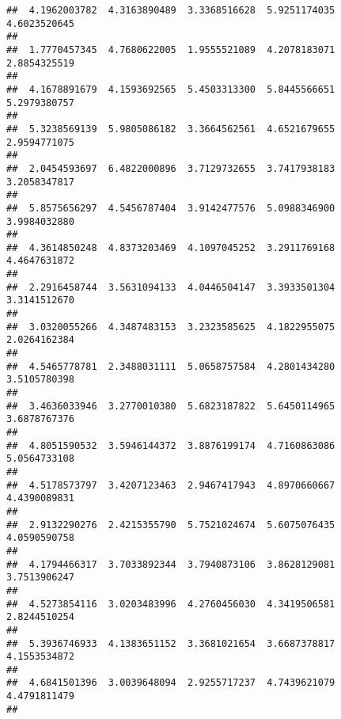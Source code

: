 \documentclass[]{article}
\begin{document}
\begin{verbatim}
##  4.1962003782  4.3163890489  3.3368516628  5.9251174035  4.6023520645 
##                                                                       
##  1.7770457345  4.7680622005  1.9555521089  4.2078183071  2.8854325519 
##                                                                       
##  4.1678891679  4.1593692565  5.4503313300  5.8445566651  5.2979380757 
##                                                                       
##  5.3238569139  5.9805086182  3.3664562561  4.6521679655  2.9594771075 
##                                                                       
##  2.0454593697  6.4822000896  3.7129732655  3.7417938183  3.2058347817 
##                                                                       
##  5.8575656297  4.5456787404  3.9142477576  5.0988346900  3.9984032880 
##                                                                       
##  4.3614850248  4.8373203469  4.1097045252  3.2911769168  4.4647631872 
##                                                                       
##  2.2916458744  3.5631094133  4.0446504147  3.3933501304  3.3141512670 
##                                                                       
##  3.0320055266  4.3487483153  3.2323585625  4.1822955075  2.0264162384 
##                                                                       
##  4.5465778781  2.3488031111  5.0658757584  4.2801434280  3.5105780398 
##                                                                       
##  3.4636033946  3.2770010380  5.6823187822  5.6450114965  3.6878767376 
##                                                                       
##  4.8051590532  3.5946144372  3.8876199174  4.7160863086  5.0564733108 
##                                                                       
##  4.5178573797  3.4207123463  2.9467417943  4.8970660667  4.4390089831 
##                                                                       
##  2.9132290276  2.4215355790  5.7521024674  5.6075076435  4.0590590758 
##                                                                       
##  4.1794466317  3.7033892344  3.7940873106  3.8628129081  3.7513906247 
##                                                                       
##  4.5273854116  3.0203483996  4.2760456030  4.3419506581  2.8244510254 
##                                                                       
##  5.3936746933  4.1383651152  3.3681021654  3.6687378817  4.1553534872 
##                                                                       
##  4.6841501396  3.0039648094  2.9255717237  4.7439621079  4.4791811479 
##                                                                       

\end{verbatim}
\end{document}
